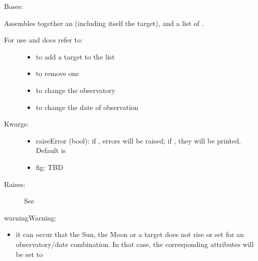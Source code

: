 \documentclass[letterpaper,10pt,english]{sphinxmanual}
\begin{document}
\begin{fulllineitems}
\label{astroobs:astroobs.Observation.Observation}
Bases: 

Assembles together an  (including itself the  target), and a list of .
\begin{description}
\item[{For use and docs refer to:}] \leavevmode\begin{itemize}
\item {} 
 to add a target to the list

\item {} 
 to remove one

\item {} 
 to change the observatory

\item {} 
 to change the date of observation

\end{itemize}

\item[{Kwargs:}] \leavevmode\begin{itemize}
\item {} 
raiseError (bool): if , errors will be raised; if , they will be printed. Default is 

\item {} 
fig: TBD

\end{itemize}

\item[{Raises:}] \leavevmode
See 

\end{description}

\begin{notice}{warning}{Warning:}\begin{itemize}
\item {} 
it can occur that the Sun, the Moon or a target does not rise or set for an observatory/date combination. In that case, the corresponding attributes will be set to 


\end{itemize}
\end{notice}
\end{fulllineitems}
\end{document}
